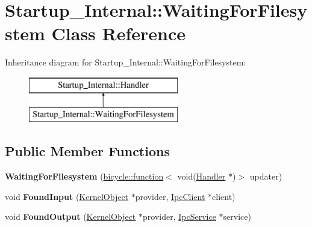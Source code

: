 \hypertarget{class_startup___internal_1_1_waiting_for_filesystem}{}\section{Startup\+\_\+\+Internal\+:\+:Waiting\+For\+Filesystem Class Reference}
\label{class_startup___internal_1_1_waiting_for_filesystem}
Inheritance diagram for Startup\+\_\+\+Internal\+:\+:Waiting\+For\+Filesystem\+:\begin{figure}[H]
\begin{center}
\leavevmode
\includegraphics[height=2.000000cm]{class_startup___internal_1_1_waiting_for_filesystem}
\end{center}
\end{figure}
\subsection*{Public Member Functions}
\begin{DoxyCompactItemize}
\item 
\mbox{\label{class_startup___internal_1_1_waiting_for_filesystem_aa7bdccddf4fe70e17eb361d1860322fb}} 
{\bfseries Waiting\+For\+Filesystem} (\hyperlink{classbicycle_1_1function}{bicycle\+::function}$<$ void(\hyperlink{class_startup___internal_1_1_handler}{Handler} $\ast$)$>$ updater)
\item 
\mbox{\label{class_startup___internal_1_1_waiting_for_filesystem_aa107fd5e90fbc9a39e38129e1055473a}} 
void {\bfseries Found\+Input} (\hyperlink{class_kernel_object}{Kernel\+Object} $\ast$provider, \hyperlink{class_ipc_client}{Ipc\+Client} $\ast$client)
\item 
\mbox{\label{class_startup___internal_1_1_waiting_for_filesystem_a5c581d151ab8c27243e7fc331ef4a0c3}} 
void {\bfseries Found\+Output} (\hyperlink{class_kernel_object}{Kernel\+Object} $\ast$provider, \hyperlink{class_ipc_service}{Ipc\+Service} $\ast$service)
\end{DoxyCompactItemize}

